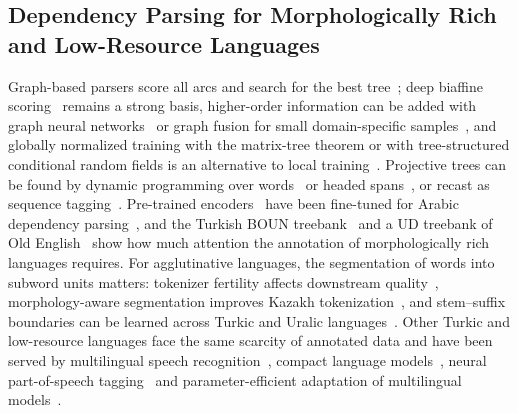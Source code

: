 \documentclass[mathematics,article,submit,pdftex,oneauthor]{Definitions/mdpi}
\begin{document}
\subsection{Dependency Parsing for Morphologically Rich and Low-Resource Languages}
Graph-based parsers score all arcs and search for the best tree~\cite{McDonald2005,Wu2017Transformed}; deep biaffine scoring~\cite{Dozat2017,Qi2020} remains a strong basis, higher-order information can be added with graph neural networks~\cite{Li2022SemanticDP} or graph fusion for small domain-specific samples~\cite{Li2023DATMT}, and globally normalized training with the matrix-tree theorem or with tree-structured conditional random fields is an alternative to local training~\cite{Koo2007,Zhang2020TreeCRF}.
Projective trees can be found by dynamic programming over words~\cite{Eisner1996} or headed spans~\cite{Yang2022}, or recast as sequence tagging~\cite{Amini2023}.
Pre-trained encoders~\cite{Devlin2019} have been fine-tuned for Arabic dependency parsing~\cite{AlGhamdi2023Arabic}, and the Turkish BOUN treebank~\cite{Turk2022} and a UD treebank of Old English~\cite{MartinArista2024UD} show how much attention the annotation of morphologically rich languages requires.
For agglutinative languages, the segmentation of words into subword units matters: tokenizer fertility affects downstream quality~\cite{Rust2021}, morphology-aware segmentation improves Kazakh tokenization~\cite{Tukeyev2026CSE}, and stem--suffix boundaries can be learned across Turkic and Uralic languages~\cite{Ibiyev2026Segmentation}.
Other Turkic and low-resource languages face the same scarcity of annotated data and have been served by multilingual speech recognition~\cite{Mussakhojayeva2023Turkic}, compact language models~\cite{Kadyrbek2025Kazakh}, neural part-of-speech tagging~\cite{Maimaiti2017Uyghur} and parameter-efficient adaptation of multilingual models~\cite{Sel2024Adaptation}.
\end{document}
